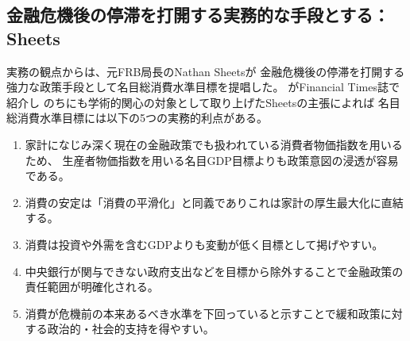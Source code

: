 \subsection{金融危機後の停滞を打開する実務的な手段とする：Sheets}
\label{sec:chapter2_review_sheets}
実務の観点からは、元FRB局長のNathan Sheetsが
金融危機後の停滞を打開する強力な政策手段として名目総消費水準目標を提唱した\parencite{Harding2011}。
\textcite{Harding2011}がFinancial Times誌で紹介し
のちに\textcite{Chen2019}も学術的関心の対象として取り上げたSheetsの主張によれば
名目総消費水準目標には以下の5つの実務的利点がある。
\begin{enumerate}
  \item[(i)]家計になじみ深く現在の金融政策でも扱われている消費者物価指数を用いるため、
  生産者物価指数を用いる名目GDP目標よりも政策意図の浸透が容易である。
  \item[(ii)]消費の安定は「消費の平滑化」と同義でありこれは家計の厚生最大化に直結する。
  \item[(iii)]消費は投資や外需を含むGDPよりも変動が低く目標として掲げやすい。
  \item[(iv)]中央銀行が関与できない政府支出などを目標から除外することで金融政策の責任範囲が明確化される。
  \item[(v)]消費が危機前の本来あるべき水準を下回っていると示すことで緩和政策に対する政治的・社会的支持を得やすい。
\end{enumerate}

